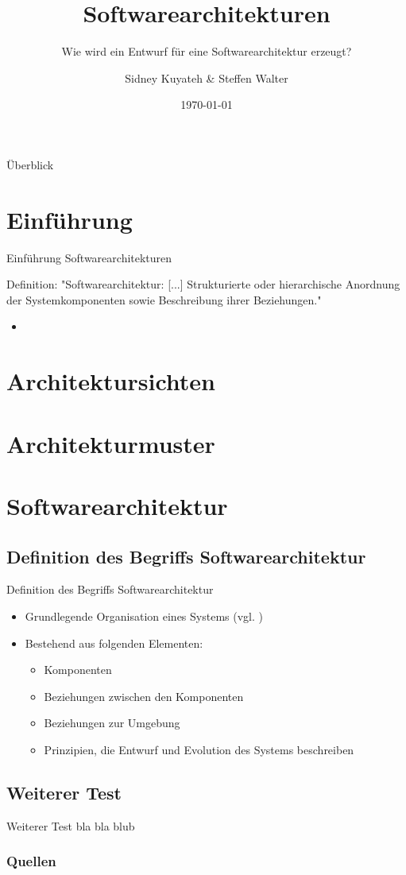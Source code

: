 \documentclass{beamer}
\title{Softwarearchitekturen}
\subtitle{Wie wird ein Entwurf für eine Softwarearchitektur erzeugt?}
\author{Sidney Kuyateh \& Steffen Walter}
\institute{Duale Hochschule Baden-Württemberg}
\date{\today}
\begin{document}
	\maketitle
	\begin{frame}{Überblick}
		\tableofcontents
	\end{frame}
		\section{Einführung}
		\begin{frame}{Einführung Softwarearchitekturen}
			\begin{block}{Definition:}
				"Softwarearchitektur: [...] Strukturierte oder hierarchische Anordnung der Systemkomponenten sowie Beschreibung ihrer Beziehungen."\cite[ S. 520]{balzert}
			\end{block}
		\begin{itemize}
			\item 
		\end{itemize}
		
		\end{frame}
		
		\section{Architektursichten}
		\section{Architekturmuster}
	
	\section{Softwarearchitektur}
		\subsection{Definition des Begriffs Softwarearchitektur}
			\begin{frame}{Definition des Begriffs Softwarearchitektur}
				\begin{itemize}
					\item Grundlegende Organisation eines Systems (vgl. \cite{gi-lexikon})
					\item Bestehend aus folgenden Elementen:
					\begin{itemize}
						\item Komponenten
						\item Beziehungen zwischen den Komponenten
						\item Beziehungen zur Umgebung
						\item Prinzipien, die Entwurf und Evolution des Systems beschreiben
					\end{itemize}
				\end{itemize}
			\end{frame}
		\subsection{Weiterer Test}
			\begin{frame}{Weiterer Test}
				bla bla blub
			\end{frame}
	\begin{frame}[allowframebreaks]
		\frametitle{Quellen}
		\printbibliography[heading=none]
	\end{frame}
\end{document}
